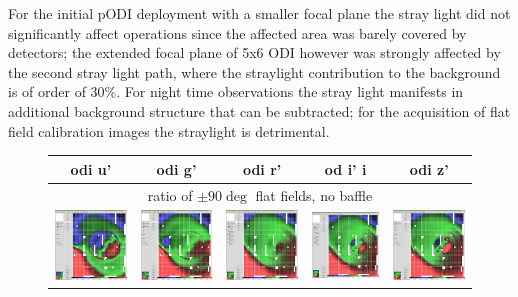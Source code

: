 \documentclass[]{spieman}
\begin{document}
For the initial pODI deployment with a smaller focal plane the stray light did
not significantly affect operations since the affected area was barely covered
by detectors; the extended focal plane of 5x6 ODI however was strongly affected
by the second stray light path, where the straylight contribution to the
background is of order of 30\%. For night time observations the stray light
manifests in additional background structure that can be subtracted; for the
acquisition of flat field calibration images the straylight is detrimental.

	\begin{figure} 
		\centering

		\begin{tabular}{ccccc} odi u' & odi g' & odi r' & od i'
			i & odi z' \\ \hline \multicolumn{5}{c}{ratio of $\pm 90 \deg$ 
				flat
				fields, no baffle} \\[1ex]
			
			\includegraphics[width=0.18\columnwidth]{images/nobaffle_u.jpeg}
			&
			\includegraphics[width=0.18\columnwidth]{images/nobaffle_g.jpeg}
			&
			\includegraphics[width=0.18\columnwidth]{images/nobaffle_r.jpeg}
			&
			\includegraphics[width=0.18\columnwidth]{images/nobaffle_i.jpeg}
			&
			\includegraphics[width=0.18\columnwidth]{images/nobaffle_z.jpeg}
			\\[2ex]
			

\end{tabular}
\end{figure}
\end{document}
